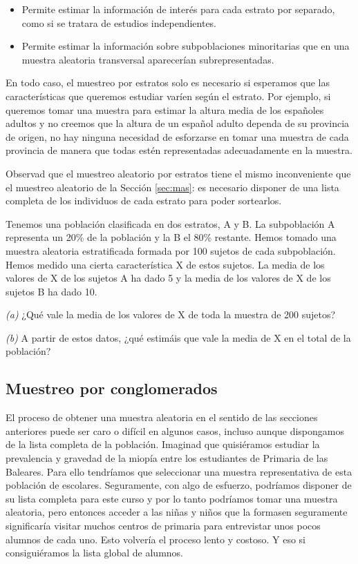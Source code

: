 \documentclass[
]{book}
\theoremstyle{definition}
\theoremstyle{definition}
\theoremstyle{definition}
\theoremstyle{definition}
\theoremstyle{remark}
\begin{document}
\begin{itemize}
\item
  Permite estimar la información de interés para cada estrato por separado, como si se tratara de estudios independientes.
\item
  Permite estimar la información sobre subpoblaciones minoritarias que en una muestra aleatoria transversal aparecerían subrepresentadas.
\end{itemize}

En todo caso, el muestreo por estratos solo es necesario si esperamos que las características que queremos estudiar varíen según el estrato. Por ejemplo, si queremos tomar una muestra para estimar la altura media de los españoles adultos y no creemos que la altura de un español adulto dependa de su provincia de origen, no hay ninguna necesidad de esforzarse en tomar una muestra de cada provincia de manera que todas estén representadas adecuadamente en la muestra.

Observad que el muestreo aleatorio por estratos tiene el mismo inconveniente que el muestreo aleatorio de la Sección \ref{sec:mas}: es necesario disponer de una lista completa de los individuos de cada estrato para poder sortearlos.

\begin{rmdexercici}
Tenemos una población clasificada en dos estratos, A y B. La subpoblación A representa un 20\% de la población y la B el 80\% restante. Hemos tomado una muestra aleatoria estratificada formada por 100 sujetos de cada subpoblación. Hemos medido una cierta característica X de estos sujetos. La media de los valores de X de los sujetos A ha dado 5 y la media de los valores de X de los sujetos B ha dado 10.

\emph{(a)} ¿Qué vale la media de los valores de X de toda la muestra de 200 sujetos?

\emph{(b)} A partir de estos datos, ¿qué estimáis que vale la media de X en el total de la población?
\end{rmdexercici}

\hypertarget{sec:mcluster}{%
\subsection{Muestreo por conglomerados}\label{sec:mcluster}}

El proceso de obtener una muestra aleatoria en el sentido de las secciones anteriores puede ser caro o difícil en algunos casos, incluso aunque dispongamos de la lista completa de la población. Imaginad que quisiéramos estudiar la prevalencia y gravedad de la miopía entre los estudiantes de Primaria de las Baleares. Para ello tendríamos que seleccionar una muestra representativa de esta población de escolares. Seguramente, con algo de esfuerzo, podríamos disponer de su lista completa para este curso y por lo tanto podríamos tomar una muestra aleatoria, pero entonces acceder a las niñas y niños que la formasen seguramente significaría visitar muchos centros de primaria para entrevistar unos pocos alumnos de cada uno. Esto volvería el proceso lento y costoso. Y eso si consiguiéramos la lista global de alumnos.
\end{document}
